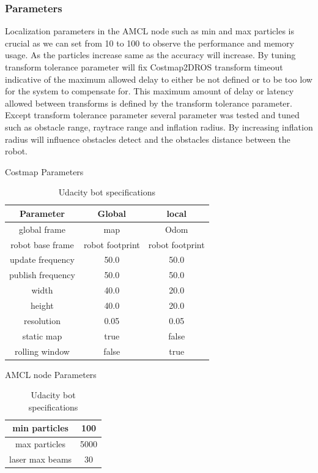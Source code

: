 \documentclass[10pt,journal,compsoc]{IEEEtran}
\begin{document}
\subsubsection{Parameters}
Localization parameters in the AMCL node such as min and max particles is crucial as we can set from 10 to 100 to observe the performance and memory usage. As the particles increase same as the accuracy will increase. By tuning transform tolerance parameter will fix Costmap2DROS transform timeout indicative of the maximum allowed delay to either be not defined or to be too low for the system to compensate for. This maximum amount of delay or latency allowed between transforms is defined by the transform tolerance parameter. Except transform tolerance parameter several parameter was tested and tuned such as obstacle range, raytrace range and inflation radius. By increasing inflation radius will influence obstacles detect and the obstacles distance between the robot.
\begin{table}[h]
 \begin{center}
       Costmap Parameters \\
       \hline
      \begin{tabular}{ |c|c|c| } 
       Parameter & Global & local \\
       \hline
       global frame & map & Odom \\
       robot base frame & robot footprint & robot footprint  \\ 
       update frequency & 50.0 & 50.0 \\
       publish frequency & 50.0 & 50.0\\
       width & 40.0 & 20.0\\
       height & 40.0 & 20.0 \\
       resolution & 0.05  & 0.05 \\
       static map & true & false \\
       rolling window & false & true\\
       \hline
      \end{tabular}
      \caption{Udacity bot specifications}
      \label{table:1}
      \end{center}
      \end{table}

\begin{table}[h]
 \begin{center}
       AMCL node Parameters\\
      \begin{tabular}{ |c|c| } 
       min particles & 100 \\
       \hline
       max particles & 5000 \\
       \hline
       laser max beams & 30 \\
       \hline
      \end{tabular}
      \caption{Udacity bot specifications}
      \label{table:1}
      \end{center}
      \end{table}
\end{document}

